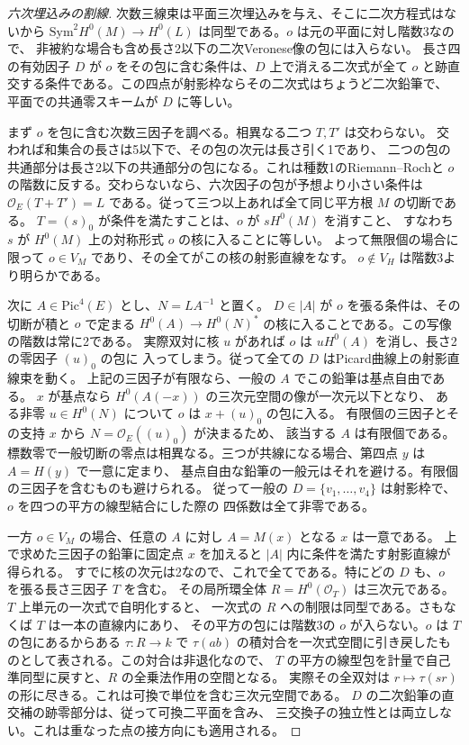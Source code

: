 \begin{proof}[六次埋込みの割線]
次数三線束は平面三次埋込みを与え、そこに二次方程式はないから
$\mathrm{Sym}^2H^0(M)\to H^0(L)$ は同型である。$o$ は元の平面に対し階数3なので、
非被約な場合も含め長さ2以下の二次Veronese像の包には入らない。
長さ四の有効因子 $D$ が $o$ をその包に含む条件は、$D$ 上で消える二次式が全て
$o$ と跡直交する条件である。この四点が射影枠ならその二次式はちょうど二次鉛筆で、
平面での共通零スキームが $D$ に等しい。

まず $o$ を包に含む次数三因子を調べる。相異なる二つ $T,T'$ は交わらない。
交われば和集合の長さは5以下で、その包の次元は長さ引く1であり、
二つの包の共通部分は長さ2以下の共通部分の包になる。これは種数1のRiemann--Rochと
$o$ の階数に反する。交わらないなら、六次因子の包が予想より小さい条件は
$\mathcal O_E(T+T')=L$ である。従って三つ以上あれば全て同じ平方根 $M$ の切断である。
$T=(s)_0$ が条件を満たすことは、$o$ が $s H^0(M)$ を消すこと、
すなわち $s$ が $H^0(M)$ 上の対称形式 $o$ の核に入ることに等しい。
よって無限個の場合に限って $o\in V_M$ であり、その全てがこの核の射影直線をなす。
$o\notin V_H$ は階数3より明らかである。

次に $A\in\mathrm{Pic}^4(E)$ とし、$N=L A^{-1}$ と置く。
$D\in|A|$ が $o$ を張る条件は、その切断が積と $o$ で定まる
$H^0(A)\to H^0(N)^*$ の核に入ることである。この写像の階数は常に2である。
実際双対に核 $u$ があれば $o$ は $uH^0(A)$ を消し、長さ2の零因子 $(u)_0$ の包に
入ってしまう。従って全ての $D$ はPicard曲線上の射影直線束を動く。
上記の三因子が有限なら、一般の $A$ でこの鉛筆は基点自由である。
$x$ が基点なら $H^0(A(-x))$ の三次元空間の像が一次元以下となり、
ある非零 $u\in H^0(N)$ について $o$ は $x+(u)_0$ の包に入る。
有限個の三因子とその支持 $x$ から $N=\mathcal O_E((u)_0)$ が決まるため、
該当する $A$ は有限個である。
標数零で一般切断の零点は相異なる。三つが共線になる場合、第四点 $y$ は $A=H(y)$ で一意に定まり、
基点自由な鉛筆の一般元はそれを避ける。有限個の三因子を含むものも避けられる。
従って一般の $D=\{v_1,\ldots,v_4\}$ は射影枠で、$o$ を四つの平方の線型結合にした際の
四係数は全て非零である。

一方 $o\in V_M$ の場合、任意の $A$ に対し $A=M(x)$ となる $x$ は一意である。
上で求めた三因子の鉛筆に固定点 $x$ を加えると $|A|$ 内に条件を満たす射影直線が得られる。
すでに核の次元は2なので、これで全てである。特にどの $D$ も、$o$ を張る長さ三因子 $T$ を含む。
その局所環全体 $R=H^0(\mathcal O_T)$ は三次元である。$T$ 上単元の一次式で自明化すると、
一次式の $R$ への制限は同型である。さもなくば $T$ は一本の直線内にあり、
その平方の包には階数3の $o$ が入らない。$o$ は $T$ の包にあるからある $\tau:R\to k$ で
$\tau(ab)$ の積対合を一次式空間に引き戻したものとして表される。この対合は非退化なので、
$T$ の平方の線型包を計量で自己準同型に戻すと、$R$ の全乗法作用の空間となる。
実際その全双対は $r\mapsto\tau(sr)$ の形に尽きる。これは可換で単位を含む三次元空間である。
$D$ の二次鉛筆の直交補の跡零部分は、従って可換二平面を含み、
三交換子の独立性とは両立しない。これは重なった点の接方向にも適用される。
\end{proof}

